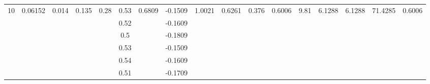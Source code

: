 \documentclass[a4paper,12pt]{article}
\begin{document}
\begin{landscape}
\begin{table}[]
\begin{tabular}{|c|c|c|c|c|c|c|c|c|c|c|c|c|c|c|c|c|}
\multirow{20}{*}{10} & \multirow{20}{*}{0.06152} & \multirow{20}{*}{0.014} & \multirow{10}{*}{0.135} & \multirow{10}{*}{0.28} & 0.53 & \multirow{20}{*}{0.6809} & -0.1509 & \multirow{20}{*}{1.0021} & \multirow{10}{*}{0.6261} & \multirow{10}{*}{0.376}   & \multirow{10}{*}{0.6006}  & \multirow{20}{*}{9.81} & \multirow{10}{*}{6.1288}  & \multirow{10}{*}{6.1288}               & \multirow{20}{*}{71.4285} & \multirow{10}{*}{0.6006}  \\ \cline{6-6} \cline{8-8}
                     &                           &                         &                         &                        & 0.52 &                          & -0.1609 &                          &                          &                           &                           &                        &                           &                                        &                           &                           \\ \cline{6-6} \cline{8-8}
                     &                           &                         &                         &                        & 0.5  &                          & -0.1809 &                          &                          &                           &                           &                        &                           &                                        &                           &                           \\ \cline{6-6} \cline{8-8}
                     &                           &                         &                         &                        & 0.53 &                          & -0.1509 &                          &                          &                           &                           &                        &                           &                                        &                           &                           \\ \cline{6-6} \cline{8-8}
                     &                           &                         &                         &                        & 0.54 &                          & -0.1609 &                          &                          &                           &                           &                        &                           &                                        &                           &                           \\ \cline{6-6} \cline{8-8}
                     &                           &                         &                         &                        & 0.51 &                          & -0.1709 &                          &                          &                           &                           &                        &                           &                                        &                           &                           \\ \cline{6-6} \cline{8-8}

\end{tabular}
\end{table}
\end{landscape}
\end{document}
